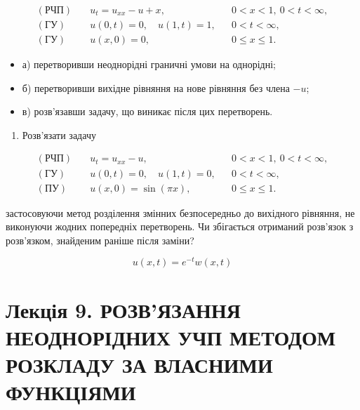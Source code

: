 \documentclass[
  ukrainian,
]{article}
\providecommand{\tightlist}{%
  \setlength{\itemsep}{0pt}\setlength{\parskip}{0pt}}
\begin{document}
\[
\begin{aligned}
(\text{РЧП})\quad & u_t = u_{xx} - u + x, && 0 < x < 1,\ 0 < t < \infty, \\
(\text{ГУ})\quad & u(0,t) = 0,\quad u(1,t) = 1, && 0 < t < \infty, \\
(\text{ГУ})\quad & u(x,0) = 0, && 0 \leqslant x \leqslant 1.
\end{aligned}
\]

\begin{itemize}
\tightlist
\item
  а) перетворивши неоднорідні граничні умови на однорідні;
\item
  б) перетворивши вихідне рівняння на нове рівняння без члена \(-u\);
\item
  в) розв'язавши задачу, що виникає після цих перетворень.
\end{itemize}

\begin{enumerate}
\def\labelenumi{\arabic{enumi}.}
\setcounter{enumi}{2}
\tightlist
\item
  Розв'язати задачу
\end{enumerate}

\[
\begin{aligned}
(\text{РЧП})\quad & u_t = u_{xx} - u, && 0 < x < 1,\ 0 < t < \infty, \\
(\text{ГУ})\quad & u(0,t) = 0,\quad u(1,t) = 0, && 0 < t < \infty, \\
(\text{ПУ})\quad & u(x,0) = \sin(\pi x), && 0 \leqslant x \leqslant 1.
\end{aligned}
\]

застосовуючи метод розділення змінних безпосередньо до вихідного
рівняння, не виконуючи жодних попередніх перетворень. Чи збігається
отриманий розв'язок з розв'язком, знайденим раніше після заміни?

\[
u(x,t) = e^{-t}w(x,t)
\]

\section{Лекція 9. РОЗВ'ЯЗАННЯ НЕОДНОРІДНИХ УЧП МЕТОДОМ РОЗКЛАДУ ЗА
ВЛАСНИМИ
ФУНКЦІЯМИ}\label{ux43bux435ux43aux446ux456ux44f-9.-ux440ux43eux437ux432ux44fux437ux430ux43dux43dux44f-ux43dux435ux43eux434ux43dux43eux440ux456ux434ux43dux438ux445-ux443ux447ux43f-ux43cux435ux442ux43eux434ux43eux43c-ux440ux43eux437ux43aux43bux430ux434ux443-ux437ux430-ux432ux43bux430ux441ux43dux438ux43cux438-ux444ux443ux43dux43aux446ux456ux44fux43cux438}
\end{document}
